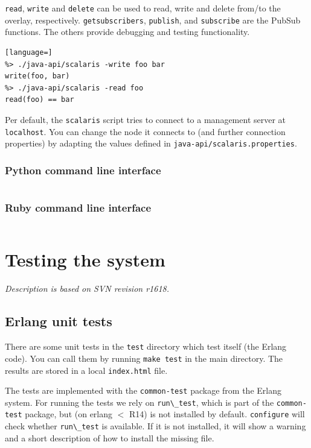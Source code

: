 \documentclass[a4paper]{scrreprt}
\newcommand{\code}[1]{\lstinline[basicstyle=\ttfamily]!#1!}
\newcommand{\svnrev}[1]
{\hfill\emph{Description is based on SVN revision #1.}\medskip}
\begin{document}
\code{read}, \code{write} and \code{delete} can be used to read, write
and delete from/to the overlay, respectively. \code{getsubscribers},
\code{publish}, and \code{subscribe} are the PubSub functions. The others
provide debugging and testing functionality.

\begin{lstlisting}[language=]
%> ./java-api/scalaris -write foo bar
write(foo, bar)
%> ./java-api/scalaris -read foo
read(foo) == bar
\end{lstlisting}

Per default, the \code{scalaris} script tries to connect to a management
server at \code{localhost}. You can change the node it connects to (and
further connection properties) by adapting the values defined in
\code{java-api/scalaris.properties}.

\subsection{Python command line interface}

\begin{lstlisting}[language=sh]
%> ./python-api/scalaris_client.py --help
\end{lstlisting}


\subsection{Ruby command line interface}

\begin{lstlisting}[language=sh]
%> ../ruby-api/scalaris_client.rb --help
\end{lstlisting}



\chapter{Testing the system}
\svnrev{r1618}

\section{Erlang unit tests}
There are some unit tests in the \code{test} directory which test \scalaris{}
itself (the Erlang code). You can call them
by running \code{make test} in the main directory. The results are stored
in a local \code{index.html} file. 

The tests are implemented with the \code{common-test} package from the
Erlang system. For running the tests we rely on \code{run\_test},
which is part of the \code{common-test} package, but (on erlang $<$ R14) is not
installed by default. \code{configure} will check whether \code{run\_test} is
available. If it is not installed, it will show a warning and a short
description of how to install the missing file.
\end{document}
